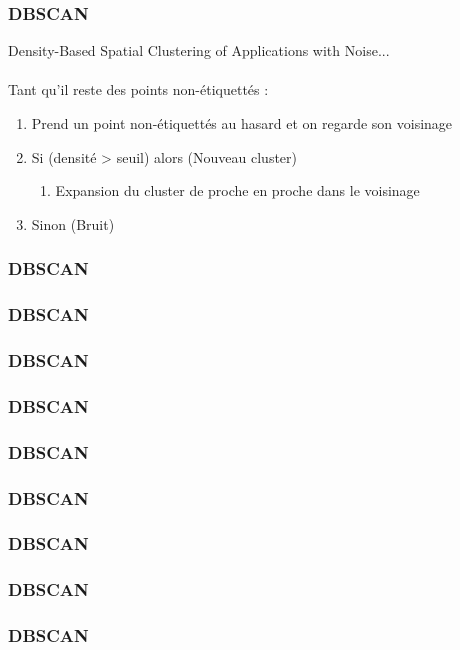 
\begin{frame}
  \frametitle{DBSCAN}
  Density-Based Spatial Clustering of Applications with Noise...\\
  \\
  Tant qu'il reste des points non-étiquettés : \\
  \begin{enumerate}
  \item Prend un point non-étiquettés au hasard et on regarde son voisinage
  \item Si (densité > seuil) alors (Nouveau cluster)
    \begin{enumerate}
    \item Expansion du cluster de proche en proche dans le voisinage
    \end{enumerate}
  \item Sinon (Bruit)
  \end{enumerate}
\end{frame}

\begin{frame}
  \frametitle{DBSCAN}
\end{frame}

\begin{frame}
  \frametitle{DBSCAN}
\end{frame}

\begin{frame}
  \frametitle{DBSCAN}
\end{frame}

\begin{frame}
  \frametitle{DBSCAN}
\end{frame}

\begin{frame}
  \frametitle{DBSCAN}
\end{frame}

\begin{frame}
  \frametitle{DBSCAN}
\end{frame}

\begin{frame}
  \frametitle{DBSCAN}
\end{frame}

\begin{frame}
  \frametitle{DBSCAN}
\end{frame}

\begin{frame}
  \frametitle{DBSCAN}
\end{frame}
